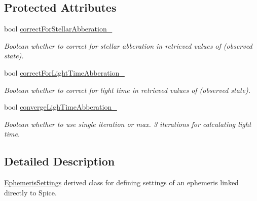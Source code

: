\subsection*{Protected Attributes}
\begin{DoxyCompactItemize}
\item 
bool \hyperlink{classtudat_1_1simulation__setup_1_1DirectSpiceEphemerisSettings_ac3452025b85ad181452a6122dbdac181}{correct\+For\+Stellar\+Abberation\+\_\+}\hypertarget{classtudat_1_1simulation__setup_1_1DirectSpiceEphemerisSettings_ac3452025b85ad181452a6122dbdac181}{}\label{classtudat_1_1simulation__setup_1_1DirectSpiceEphemerisSettings_ac3452025b85ad181452a6122dbdac181}

\begin{DoxyCompactList}\small\item\em Boolean whether to correct for stellar abberation in retrieved values of (observed state). \end{DoxyCompactList}\item 
bool \hyperlink{classtudat_1_1simulation__setup_1_1DirectSpiceEphemerisSettings_a57bef4d5f482a8856d65d365fdd559d6}{correct\+For\+Light\+Time\+Abberation\+\_\+}\hypertarget{classtudat_1_1simulation__setup_1_1DirectSpiceEphemerisSettings_a57bef4d5f482a8856d65d365fdd559d6}{}\label{classtudat_1_1simulation__setup_1_1DirectSpiceEphemerisSettings_a57bef4d5f482a8856d65d365fdd559d6}

\begin{DoxyCompactList}\small\item\em Boolean whether to correct for light time in retrieved values of (observed state). \end{DoxyCompactList}\item 
bool \hyperlink{classtudat_1_1simulation__setup_1_1DirectSpiceEphemerisSettings_a78145cb1d4718dae095391d726b7bab2}{converge\+Ligh\+Time\+Abberation\+\_\+}\hypertarget{classtudat_1_1simulation__setup_1_1DirectSpiceEphemerisSettings_a78145cb1d4718dae095391d726b7bab2}{}\label{classtudat_1_1simulation__setup_1_1DirectSpiceEphemerisSettings_a78145cb1d4718dae095391d726b7bab2}

\begin{DoxyCompactList}\small\item\em Boolean whether to use single iteration or max. 3 iterations for calculating light time. \end{DoxyCompactList}\end{DoxyCompactItemize}


\subsection{Detailed Description}
\hyperlink{classtudat_1_1simulation__setup_1_1EphemerisSettings}{Ephemeris\+Settings} derived class for defining settings of an ephemeris linked directly to Spice. 

